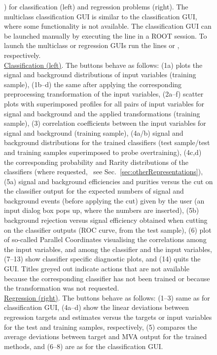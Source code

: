 \begin{figure}[p]
{              \pageref{pgr:scripttable1}) for classification (left) and regression
              problems (right). The multiclass classification GUI is similar to the classification GUI,
              where some functionality is not available.
              The classification GUI can be launched manually by executing the line
               in a ROOT
              session. To launch the multiclass or regression GUIs run the lines 
              or , respectively. \\[0.2cm]
              {\footnotesize
              \underline{Classification (left)}. The buttons behave as follows:
              (1a) plots the signal and background
              distributions of input variables (training sample), (1b--d) the
              same after applying the corresponding preprocessing transformation of the input
              variables, (2a--f) scatter plots with superimposed profiles for all
              pairs of input variables for signal and background and the applied transformations
              (training sample), (3) correlation coefficients
              between the input variables for signal and background (training sample),
              (4a/b) signal and background distributions for the trained classifiers (test
              sample/test and training samples superimposed to probe overtraining),
              (4c,d) the corresponding probability and Rarity distributions of the classifiers
              (where requested, \cf\  see Sec.~\ref{sec:otherRepresentations}),
              (5a) signal and background efficiencies and purities versus the cut on the classifier
              output for the expected numbers of signal and background events (before applying the cut)
              given by the user (an input dialog box pops up, where the numbers are inserted),
              (5b) background rejection versus signal efficiency obtained when cutting
              on the classifier outputs (ROC curve, from the test sample), (6) plot of so-called
              Parallel Coordinates visualising the correlations among the input variables, and
              among the classifier and the input variables,  (7--13) show classifier
              specific diagnostic plots, and (14) quits the GUI. Titles greyed out indicate
              actions that are not available because the corresponding classifier has not
              been trained or because the transformation was not requested.\\
              \underline{Regression (right)}. The buttons behave as follows:
              (1--3) same as for classification GUI, (4a--d) show the linear deviations between
              regression targets and estimates versus the targets or input variables for the
              test and training samples, respectively, (5) compares the average deviations
              between target and MVA output for the trained methods, and (6--8) are as for the classification GUI.}
}
\label{fig:tmvagui}
\end{figure}

